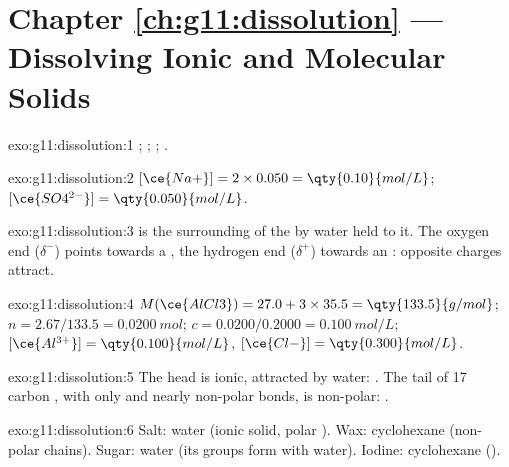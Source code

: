 \section*{Chapter \ref{ch:g11:dissolution} --- Dissolving Ionic and Molecular Solids}

\begin{solution}{exo:g11:dissolution:1}
;
;
;
.
\end{solution}

\begin{solution}{exo:g11:dissolution:2}
$[\ce{Na+}] = 2 \times 0.050 = \qty{0.10}{mol/L}$;
$[\ce{SO4^{2-}}] = \qty{0.050}{mol/L}$.
\end{solution}

\begin{solution}{exo:g11:dissolution:3}
 is the surrounding of the  by water  held to it.
The oxygen end ($\delta^-$) points towards a , the hydrogen end
($\delta^+$) towards an : opposite charges attract.
\end{solution}

\begin{solution}{exo:g11:dissolution:4}
$M(\ce{AlCl3}) = 27.0 + 3 \times 35.5 = \qty{133.5}{g/mol}$;
$n = 2.67 / 133.5 = \qty{0.0200}{mol}$; $c = 0.0200 / 0.2000 =
\qty{0.100}{mol/L}$; $[\ce{Al^{3+}}] = \qty{0.100}{mol/L}$,
$[\ce{Cl-}] = \qty{0.300}{mol/L}$.
\end{solution}

\begin{solution}{exo:g11:dissolution:5}
The head  is ionic, attracted by water: . The tail
of 17 carbon , with only  and nearly non-polar 
bonds, is non-polar: .
\end{solution}

\begin{solution}{exo:g11:dissolution:6}
Salt: water (ionic solid, polar ). Wax: cyclohexane (non-polar
chains). Sugar: water (its  groups form  with
water). Iodine: cyclohexane ().
\end{solution}

